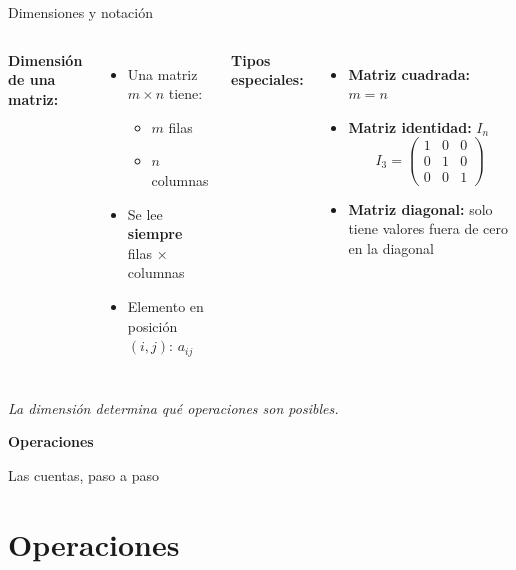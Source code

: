 \documentclass[aspectratio=169,10pt]{beamer}
\begin{document}
\begin{frame}{Dimensiones y notación}

\begin{columns}[T]
\textbf{Dimensión de una matriz:}
\begin{itemize}
    \item Una matriz $m \times n$ tiene:
    \begin{itemize}
        \item $m$ filas
        \item $n$ columnas
    \end{itemize}
    \item Se lee \textbf{siempre} filas $\times$ columnas
    \item Elemento en posición $(i,j)$: $a_{ij}$
\end{itemize}

\textbf{Tipos especiales:}
\begin{itemize}
    \item \textbf{Matriz cuadrada:} $m = n$
    \item \textbf{Matriz identidad:} $I_n$
    $$I_3 = \begin{pmatrix} 1 & 0 & 0 \\ 0 & 1 & 0 \\ 0 & 0 & 1 \end{pmatrix}$$
    \item \textbf{Matriz diagonal:} solo tiene valores fuera de cero en la diagonal
\end{itemize}
\end{columns}

\vspace{0.4cm}
\begin{center}
\textit{La dimensión determina qué operaciones son posibles.}
\end{center}
\end{frame}

\begin{frame}
\begin{center}
\vspace{1.5cm}
\Huge \textbf{Operaciones}

\vspace{0.5cm}
\Large Las cuentas, paso a paso
\end{center}
\end{frame}

\section{Operaciones}
\end{document}
